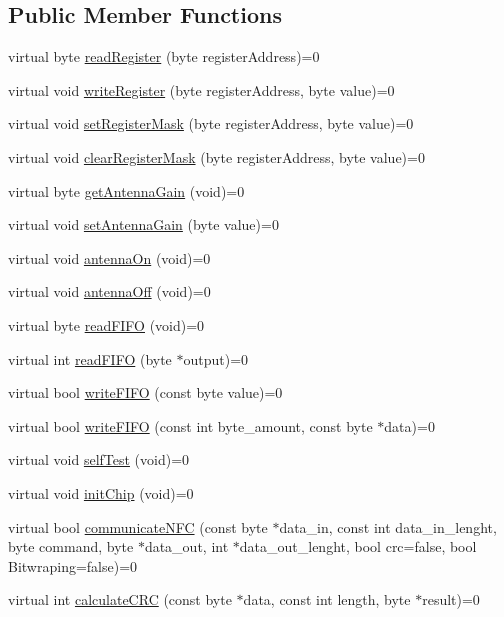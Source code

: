 \subsection*{Public Member Functions}
\begin{DoxyCompactItemize}
\item 
virtual byte \hyperlink{classnfccontroler_aaf3c333dece31c91679bb60a58bf1ef9}{read\+Register} (byte register\+Address)=0
\item 
virtual void \hyperlink{classnfccontroler_a0ea9c75e4dbe9dbeb81b49cac5e382db}{write\+Register} (byte register\+Address, byte value)=0
\item 
virtual void \hyperlink{classnfccontroler_af35dd99e72c2321c50dec98529e04a83}{set\+Register\+Mask} (byte register\+Address, byte value)=0
\item 
virtual void \hyperlink{classnfccontroler_a02cfe73ff95bd107f2020ada91ac7af4}{clear\+Register\+Mask} (byte register\+Address, byte value)=0
\item 
virtual byte \hyperlink{classnfccontroler_a99c9451d564a62c525925f8ca79a9d1e}{get\+Antenna\+Gain} (void)=0
\item 
virtual void \hyperlink{classnfccontroler_ae76958998275b8e4acc04c1fe61998e5}{set\+Antenna\+Gain} (byte value)=0
\item 
virtual void \hyperlink{classnfccontroler_a161af319560127b028504add241a8bc6}{antenna\+On} (void)=0
\item 
virtual void \hyperlink{classnfccontroler_a0d8180637c367d223d437a506a641bae}{antenna\+Off} (void)=0
\item 
virtual byte \hyperlink{classnfccontroler_afcab6129cc6c97452f998c46e8088d01}{read\+F\+I\+FO} (void)=0
\item 
virtual int \hyperlink{classnfccontroler_ac1b18db7bd72cf1a2d6cd995ee3919cb}{read\+F\+I\+FO} (byte $\ast$output)=0
\item 
virtual bool \hyperlink{classnfccontroler_aef681b8f4a4a7d982c30ee2d9e8124da}{write\+F\+I\+FO} (const byte value)=0
\item 
virtual bool \hyperlink{classnfccontroler_a5e9de8b00b7bea62fe4f422a898018a9}{write\+F\+I\+FO} (const int byte\+\_\+amount, const byte $\ast$data)=0
\item 
virtual void \hyperlink{classnfccontroler_adf8ddf5ba68a3d6689f5cdc15e294151}{self\+Test} (void)=0
\item 
virtual void \hyperlink{classnfccontroler_a4f5a22e5f25f56abe26ed0034a296135}{init\+Chip} (void)=0
\item 
virtual bool \hyperlink{classnfccontroler_a742e67e43b865074c4f23fb6c133cdd7}{communicate\+N\+FC} (const byte $\ast$data\+\_\+in, const int data\+\_\+in\+\_\+lenght, byte command, byte $\ast$data\+\_\+out, int $\ast$data\+\_\+out\+\_\+lenght, bool crc=false, bool Bitwraping=false)=0
\item 
virtual int \hyperlink{classnfccontroler_a0a04b877e9de8677b5bfe9e28424cbca}{calculate\+C\+RC} (const byte $\ast$data, const int length, byte $\ast$result)=0
\end{DoxyCompactItemize}


